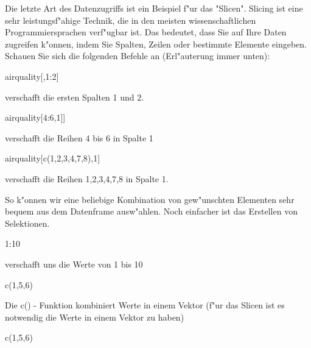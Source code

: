 \documentclass[a4paper,twoside]{tufte-book}\usepackage[]{graphicx}\usepackage[]{color}
\begin{document}
\begin{appendices}
Die letzte Art des Datenzugriffs ist ein Beispiel f"ur das "Slicen". Slicing ist eine sehr leistungsf"ahige Technik, die in den meisten wissenschaftlichen Programmiersprachen verf"ugbar ist. Das bedeutet, dass Sie auf Ihre Daten zugreifen k"onnen, indem Sie Spalten, Zeilen oder bestimmte Elemente eingeben. Schauen Sie sich die folgenden Befehle an (Erl"auterung immer unten):

\begin{Schunk}
\begin{Sinput}
airquality[,1:2]
\end{Sinput}
\end{Schunk}

verschafft die ersten Spalten 1 und 2.


\begin{Schunk}
\begin{Sinput}
airquality[4:6,1]]
\end{Sinput}
\end{Schunk}

verschafft die Reihen 4 bis 6 in Spalte 1


\begin{Schunk}
\begin{Sinput}
airquality[c(1,2,3,4,7,8),1]
\end{Sinput}
\end{Schunk}

verschafft die Reihen 1,2,3,4,7,8 in Spalte 1. 

So k"onnen wir eine beliebige Kombination von gew"unschten Elementen sehr bequem aus dem Datenframe ausw"ahlen. Noch einfacher ist das Erstellen von Selektionen.


\begin{Schunk}
\begin{Sinput}
1:10
\end{Sinput}
\end{Schunk}

verschafft uns die Werte von 1 bis 10

\begin{Schunk}
\begin{Sinput}
c(1,5,6)
\end{Sinput}
\end{Schunk}

Die c() - Funktion kombiniert Werte in einem Vektor (f"ur das Slicen ist es notwendig die Werte in einem Vektor zu haben)

\begin{Schunk}
\begin{Sinput}
c(1,5,6)
\end{Sinput}
\end{Schunk}


\end{appendices}
\end{document}
